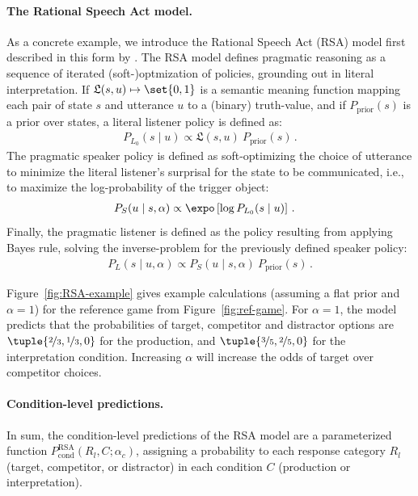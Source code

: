\documentclass[fleqn]{article}
\begin{document}
\paragraph{The Rational Speech Act model.}
As a concrete example, we introduce the Rational Speech Act (RSA) model first described in this form by \citet{FrankGoodman2012:Predicting-Prag} \citep[for overview see][]{FrankeJager2015:Probabilistic-p,GoodmanFrank2016:Pragmatic-Langu,StevensBenz2018:Game-Theoretic-,ScontrasTessler2021:A-practical-int,Degen2023:The-Rational-Sp}.
The RSA model defines pragmatic reasoning as a sequence of iterated (soft-)optmization of policies, grounding out in literal interpretation.
If $\mathfrak{L}(s,u) \mapsto \set{0,1}$ is a semantic meaning function mapping each pair of state $s$ and utterance $u$ to a (binary) truth-value, and if $P_{\text{prior}}(s)$ is a prior over states, a literal listener policy is defined as:
%
\begin{align*}
 P_{L_{0}}(s \mid u) \propto \mathfrak{L}(s,u)\  P_{\text{prior}}(s)\,.
\end{align*}
%
The pragmatic speaker policy is defined as soft-optimizing the choice of utterance to minimize the literal listener's surprisal for the state to be communicated, i.e., to maximize the log-probability of the trigger object:
%
\begin{align}
  \label{eq:RSA-speaker}
  P_{S}(u \mid s, \alpha) & \propto \expo \left [ \log P_{L_{0}}(s \mid u) \right ] \,.
\end{align}
%
Finally, the pragmatic listener is defined as the policy resulting from applying Bayes rule, solving the inverse-problem for the previously defined speaker policy:
%
\begin{align}
  \label{eq:RSA-interpreter}
  P_{L}(s \mid u, \alpha) \propto  P_{S}(u \mid s, \alpha) \  P_{\text{prior}}(s) \,.
\end{align}


Figure~\ref{fig:RSA-example} gives example calculations (assuming a flat prior and $\alpha=1$) for the reference game from Figure~\ref{fig:ref-game}.
For $\alpha=1$, the model predicts that the probabilities of target, competitor and distractor options are $\tuple{\nicefrac{2}{3}, \nicefrac{1}{3}, 0}$ for the production, and $\tuple{\nicefrac{3}{5}, \nicefrac{2}{5}, 0}$ for the interpretation condition.
Increasing $\alpha$ will increase the odds of target over competitor choices.

\paragraph{Condition-level predictions.}
In sum, the condition-level predictions of the RSA model are a parameterized function $P_{\text{cond}}^{\text{RSA}}(R_{l}, C; \alpha_{c})$, assigning a probability to each response category $R_{l}$ (target, competitor, or distractor) in each condition $C$ (production or interpretation).
\end{document}
